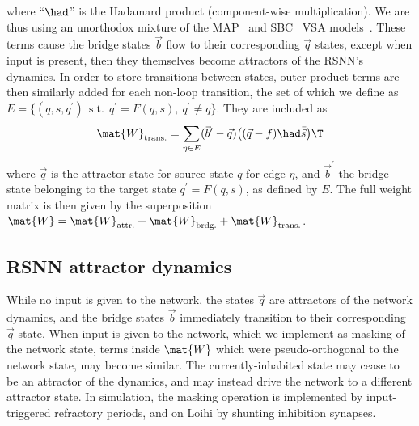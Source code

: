 where ``$\had$'' is the Hadamard product (component-wise multiplication).
We are thus using an unorthodox mixture of the MAP~\cite{gayler_multiplicative_1998} and SBC~\cite{laiho_high-dimensional_2015, frady_variable_2023} VSA models~\cite{kleyko_survey_2022}.
These terms cause the bridge states $\vec{b}$ flow to their corresponding $\vec{q}$ states, except when input is present, then they themselves become attractors of the RSNN's dynamics.
In order to store transitions between states, outer product terms are then similarly added for each non-loop transition, the set of which we define as $ E =  \{ (q, s, q^\prime ) \: \ \text{s.t.} \ \: q^\prime = F(q,s), \: q^\prime \neq q \}$. They are included as
\begin{equation}
\begin{split}
    \mat{W}_{\text{trans.}}  = \sum_{\eta \in E}  (\vec{b}^\prime - \vec{q}) \big( (\vec{q} - f ) \had \bar{\vec{s}} \big)\T
\end{split}
\label{eqn:W_tran}
\end{equation}
where $\vec{q}$ is the attractor state for source state $q$ for edge $\eta$, and $\vec{b}^\prime$ the bridge state belonging to the target state $q^\prime = F(q, s)$, as defined by $E$. The full weight matrix is then given by the superposition $\mat{W} = \mat{W}_\text{attr.} + \mat{W}_\text{brdg.} + \mat{W}_\text{trans.}$.

\subsection{RSNN attractor dynamics}
\label{sec:rsnn_dynamics}

While no input is given to the network, the states $\vec{q}$ are attractors of the network dynamics, and the bridge states $\vec{b}$ immediately transition to their corresponding $\vec{q}$ state. When input is given to the network, which we implement as masking of the network state, terms inside $\mat{W}$ which were pseudo-orthogonal to the network state, may become similar. The currently-inhabited state may cease to be an attractor of the dynamics, and may instead drive the network to a different attractor state. In simulation, the masking operation is implemented by input-triggered refractory periods, and on Loihi by shunting inhibition synapses.

